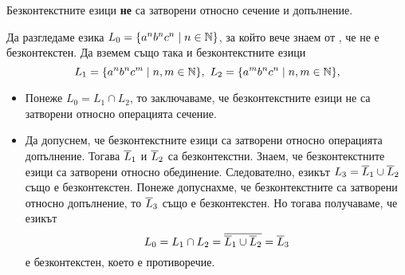 \begin{framed}
  \begin{proposition}
    Безконтекстните езици {\bf не} са затворени относно сечение и допълнение.
  \end{proposition}
\end{framed}
\begin{hint}
  Да разгледаме езика $L_0 = \{a^nb^nc^n\mid n\in\mathbb{N}\}$, за който вече знаем от , че не е безконтекстен.
  Да вземем също така и безконтекстните езици 
  \[L_1 = \{a^nb^nc^m\mid n,m\in\mathbb{N}\},\ L_2 = \{a^mb^nc^n\mid n,m\in\mathbb{N}\},\]
  \begin{itemize}
  \item 
    Понеже $L_0 = L_1\cap L_2$, то заключаваме, че безконтекстните езици не са затворени 
    относно операцията сечение.
  \item
    Да допуснем, че безконтекстните езици са затворени относно операцията допълнение.
    Тогава  $\overline{L}_1$ и $\overline{L}_2$ са безконтекстни.
    Знаем, че безконтекстните езици са затворени относно обединение. 
    Следователно, езикът $L_3 = \overline{L}_1 \cup \overline{L}_2$ също е безконтекстен.
    Понеже допуснахме, че безконтекстните са затворени относно допълнение, то $\overline{L}_3$ също е безконтекстен.
    Но тогава получаваме, че езикът
    \[L_0 = L_1 \cap L_2 = \overline{\overline{L}_1 \cup \overline{L}_2} = \overline{L}_3\]
    е безконтекстен, което е противоречие.
  \end{itemize}
\end{hint}

